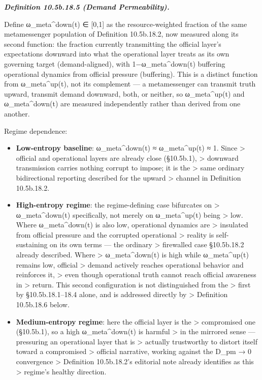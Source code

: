 \documentclass[
]{article}
\begin{document}
\emph{\textbf{Definition 10.5b.18.5 (Demand Permeability).}}

Define ω\_meta\^{}down(t) ∈ {[}0,1{]} as the resource-weighted fraction
of the same metamessenger population of Definition 10.5b.18.2, now
measured along its second function: the fraction currently transmitting
the official layer's expectations downward into what the operational
layer treats as its own governing target (demand-aligned), with
1−ω\_meta\^{}down(t) buffering operational dynamics from official
pressure (buffering). This is a distinct function from ω\_meta\^{}up(t),
not its complement --- a metamessenger can transmit truth upward,
transmit demand downward, both, or neither, so ω\_meta\^{}up(t) and
ω\_meta\^{}down(t) are measured independently rather than derived from
one another.

Regime dependence:

\begin{itemize}
\item
  \textbf{Low-entropy baseline}: ω\_meta\^{}down(t) ≈ ω\_meta\^{}up(t) ≈
  1. Since \textgreater{} official and operational layers are already
  close (§10.5b.1), \textgreater{} downward transmission carries nothing
  corrupt to impose; it is the \textgreater{} same ordinary
  bidirectional reporting described for the upward \textgreater{}
  channel in Definition 10.5b.18.2.
\item
  \textbf{High-entropy regime}: the regime-defining case bifurcates on
  \textgreater{} ω\_meta\^{}down(t) specifically, not merely on
  ω\_meta\^{}up(t) being \textgreater{} low. Where ω\_meta\^{}down(t) is
  also low, operational dynamics are \textgreater{} insulated from
  official pressure and the corrupted operational \textgreater{} reality
  is self-sustaining on its own terms --- the ordinary \textgreater{}
  firewalled case §10.5b.18.2 already described. Where \textgreater{}
  ω\_meta\^{}down(t) is high while ω\_meta\^{}up(t) remains low,
  official \textgreater{} demand actively reaches operational behavior
  and reinforces it, \textgreater{} even though operational truth cannot
  reach official awareness in \textgreater{} return. This second
  configuration is not distinguished from the \textgreater{} first by
  §10.5b.18.1--18.4 alone, and is addressed directly by \textgreater{}
  Definition 10.5b.18.6 below.
\item
  \textbf{Medium-entropy regime}: here the official layer is the
  \textgreater{} compromised one (§10.5b.1), so a high
  ω\_meta\^{}down(t) is harmful \textgreater{} in the mirrored sense ---
  pressuring an operational layer that is \textgreater{} actually
  trustworthy to distort itself toward a compromised \textgreater{}
  official narrative, working against the D\_pm → 0 convergence
  \textgreater{} Definition 10.5b.18.2's editorial note already
  identifies as this \textgreater{} regime's healthy direction.
\end{itemize}
\end{document}
